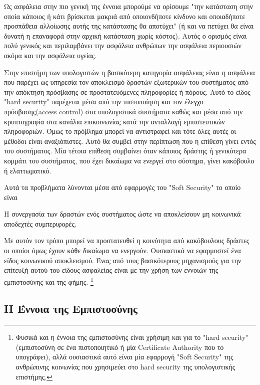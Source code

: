 Ως ασφάλεια στην πιο γενική της έννοια μπορούμε να ορίσουμε "την κατάσταση στην οποία κάποιος ή κάτι βρίσκεται μακριά από οποιονδήποτε κίνδυνο και οποιαδήποτε προσπάθεια αλλοίωσης αυτής της κατάστασης θα αποτύχει" (ή και να πετύχει θα είναι δυνατή η επαναφορά στην αρχική κατάσταση χωρίς κόστος). Αυτός ο ορισμός είναι πολύ γενικός και περιλαμβάνει την ασφάλεια ανθρώπων την ασφάλεια περιουσιών ακόμα και την ασφάλεια υγείας.

Στην επιστήμη των υπολογιστών η βασικότερη κατηγορία ασφάλειας είναι η ασφάλεια που παρέχει ως υπηρεσία τον αποκλεισμό δραστών εξωτερικών του συστήματος από την απόκτηση πρόσβασης σε προστατευόμενες πληροφορίες ή πόρους. Αυτό το είδος "hard security" παρέχεται μέσα από την πιστοποίηση και τον έλεγχο πρόσβασης(access control) στα υπολογιστικά συστήματα καθώς και μέσα από την κρυπτογραφία στα κανάλια επικοινωνίας κατά την ανταλλαγή εμπιστευτικών πληροφοριών. Όμως το πρόβλημα μπορεί να αντιστραφεί και τότε όλες αυτές οι μέθοδοι είναι αναξιόπιστες. Αυτό θα συμβεί στην περίπτωση που η επίθεση γίνει εντός του συστήματος. Μία τέτοια επίθεση συμβαίνει όταν κάποιος δράστης ή γενικότερα κομμάτι του συστήματος, που έχει δικαίωμα να ενεργεί στο σύστημα, γίνει κακόβουλο ή ελαττωματικό. 

Αυτά τα προβλήματα λύνονται μέσα από εφαρμογές του "Soft Security" το οποίο είναι 

\begin{soft_sec}
Η συνεργασία των δραστών ενός συστήματος ώστε να αποκλείσουν μη κοινωνικά αποδεχτές συμπεριφορές. 
\end{soft_sec}

Με αυτόν τον τρόπο μπορεί να προστατευθεί η κοινότητα από κακόβουλους δράστες οι οποίοι όμως έχουν κάθε δικαίωμα να ενεργούν. Ουσιαστικά να εφαρμοστεί ένα είδος κοινωνικού αποκλεισμού. Ένας από τους βασικότερους μηχανισμούς για την επίτευξή αυτού του είδους ασφαλείας είναι με την χρήση των εννοιών της εμπιστοσύνης και της φήμης. \footnote{Φυσικά και η έννοια της εμπιστοσύνης είναι χρήσιμη και για το "hard security" (εμπιστοσύνη σε ένα πιστοποιητικό ή μία Certificate Authority που το υπογράφει), αλλά ουσιαστικά αυτό είναι μία εφαρμογή "Soft Security" της ανθρώπινης κοινωνίας που χρησιμεύει στο hard security της υπολογιστικής επιστήμης.} 



\subsection{Η Έννοια της Εμπιστοσύνης}

